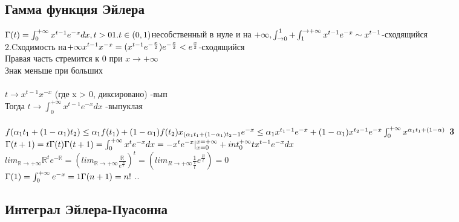 \documentclass[12pt, a4paper]{article}
\begin{document}
	\subsection{Гамма функция Эйлера}
	$ \Gamma(t) =\int_0^{+\infty} x^{t-1}e^{-x} dx, t > 0 \\
	1.  t \in (0,1) $несобственный в нуле и на $ +\infty, \int_{\rightarrow 0}^1 + \int_1^{\rightarrow +\infty}\\
	x^{t-1} e^{-x}  \sim x^{t-1} $-сходящийся\\
	2.Cходимость на$ +\infty \\
	x^{t-1} x^{-x} = (x^{t-1}e^{-\frac{x}{2}})e^{-\frac{x}{2}} < e^{\frac{x}{2}}$-сходящийся\\
	Правая часть стремится к 0 при $ x \rightarrow +\infty $\\
	Знак меньше при больших\\
	\\
	$ t \rightarrow x^{t-1} x^{-x} $ (где x > 0, диксировано) -вып \\
	Тогда $ t \rightarrow \int_0^{+\infty} x^{t-1} e^{-x} dx $
	-выпуклая\\
	\\
	$ f(\alpha_1 t_1  +(1- \alpha_1)t_2) \leq \alpha_1 f(t_1) + (1 - \alpha_1) f(t_2)\\
	x_{(\alpha_1 t_1  +(1- \alpha_1)t_2-1}e^{-x} \leq \alpha_1 x^{t_1-1}e^{-x} + (1 - \alpha_1) x^{t_2 - 1} e^{-x} \\
	\int_0^{+\infty}x^{\alpha_1 t_1 + (1 - \alpha)}$
	\textbf{3} 
	$ \Gamma(t+1)=t\Gamma(t) \\
	\Gamma(t+1)= \int_0^{+\infty} x^t e^{-x}dx = -x^t e^{-x}|_{x=0}^{x=+\infty} + int_0^{+\infty} t x ^{t-1}e^{-x}dx$ \\
	$ lim_{\mathbb{R}\rightarrow +\infty} \mathbb{R}^t e^{-\mathbb{R}} =(lim_{\mathbb{R} \rightarrow +\infty} \frac{\mathbb{R}}{e^{\frac{R}{t}}})^t = (lim_{R\rightarrow +\infty} \frac{1}{\frac{1}{t}}e^{\frac{R}{t}})=0 $\\
	
	$	\Gamma(1) = \int_0^{+ \infty}e^{-x}=1 \\
	\Gamma(n+1)= n! $
	..
	\subsection{Интеграл Эйлера-Пуасонна}
	
\end{document}
